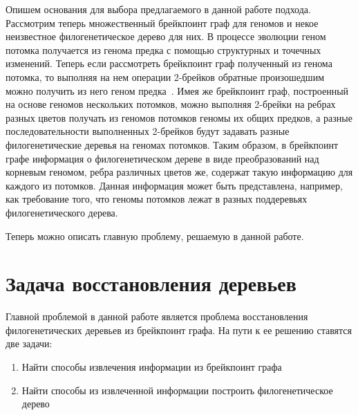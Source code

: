 Опишем основания для выбора предлагаемого в данной работе подхода.
Рассмотрим теперь множественный брейкпоинт граф для геномов и некое неизвестное филогенетическое дерево для них.
В процессе эволюции геном потомка получается из генома предка с помощью структурных и точечных изменений.
Теперь если рассмотреть брейкпоинт граф полученный из генома потомка,
то выполняя на нем операции 2-брейков обратные произошедшим можно получить из него геном предка~\cite{Alekseyev2009}.
Имея же брейкпоинт граф, построенный на основе геномов нескольких потомков,
можно выполняя 2-брейки на ребрах разных цветов получать из геномов потомков геномы их общих предков,
а разные последовательности выполненных 2-брейков будут задавать разные филогенетические деревья на геномах потомков.
Таким образом, в брейкпоинт графе  информация о филогенетическом дереве в виде преобразований над корневым геномом,
ребра различных цветов же, содержат такую информацию для каждого из потомков.
Данная информация может быть представлена, например, как требование того, что геномы потомков лежат в разных поддеревьях филогенетического дерева.

Теперь можно описать главную проблему, решаемую в данной работе.

\section{Задача восстановления деревьев}
Главной проблемой в данной работе является проблема восстановления филогенетических деревьев из брейкпоинт графа.
На пути к ее решению ставятся две задачи:
\begin{enumerate}
  \item Найти способы извлечения информации из брейкпоинт графа
  \item Найти способы из извлеченной информации построить филогенетическое дерево
\end{enumerate}
